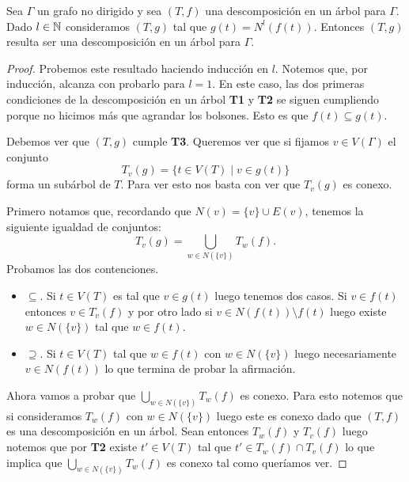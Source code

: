 \documentclass[tesis.tex]{subfiles}
\begin{document}
\begin{prop}\label{prop-vecinos-desc}
	Sea $\Gamma$ un grafo no dirigido y sea $(T,f)$ una descomposición en un árbol para $\Gamma$.
	Dado $l \in \mathbb{N}$ consideramos $(T,g)$ tal que $g(t) = N^l(f(t))$. Entonces $(T,g)$ resulta ser una descomposición en un árbol para $\Gamma$.
\end{prop}
\begin{proof}
	Probemos este resultado haciendo inducción en $l$.
	Notemos que, por inducción, alcanza con probarlo para $l =1$.
	En este caso, las dos primeras condiciones de la descomposición en un árbol \textbf{T1} y \textbf{T2} se siguen cumpliendo porque no hicimos más que agrandar los bolsones. 
	Esto es que $f(t) \subseteq g(t)$.
	
	Debemos ver que $(T,g)$ cumple \textbf{T3}.
	Queremos ver que si fijamos $v \in V(\Gamma)$ el conjunto 
	\[
		T_{v}(g) = \{ t \in V(T) \mid v \in g(t)  \}
	\]
	forma un subárbol de $T$. 
	Para ver esto nos basta con ver que $T_{v}(g)$ es conexo.

	Primero notamos que, recordando que $N({v}) = \{v\} \cup E(v)$, tenemos la siguiente igualdad de conjuntos:
	\[
		T_{v}(g) =  \bigcup_{w \in N(\{v\})} T_{w}(f).
	\]
	Probamos las dos contenciones.
	\begin{itemize}
		\item $\subseteq$.
			Si $t \in V(T)$ es tal que $v \in g(t)$ luego tenemos dos casos.
			Si $v \in f(t)$ entonces $v \in T_{v}(f)$ y por otro lado si $v \in N(f(t)) \setminus f(t)$ luego existe $w \in N(\{v\})$ tal que $w \in f(t)$. 

		\item $\supseteq$. 
			Si $t \in V(T)$ tal que $w \in f(t)$ con $w \in N(\{v\})$ luego necesariamente $v \in N(f(t))$ lo que termina de probar la afirmación.
	\end{itemize}

	Ahora vamos a probar que $\bigcup_{w \in N(\{v\})} T_{w}(f)$ es conexo.
	Para esto notemos que si consideramos $T_{w}(f)$ con $w \in N(\{v\})$ luego este es conexo dado que $(T,f)$ es una descomposición en un árbol.
	Sean entonces $T_{w}(f)$ y $T_{v}(f)$ luego notemos que por \textbf{T2} existe $t' \in V(T)$ tal que $t' \in T_{w}(f) \cap T_{v}(f)$ lo que implica que $\bigcup_{w \in N(\{v\})} T_{w}(f)$ es conexo tal como queríamos ver.



	
	
		
\end{proof}
\end{document}

